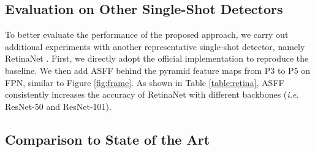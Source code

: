 \documentclass[10pt,twocolumn,letterpaper]{article}
\begin{document}
\subsection{Evaluation on Other Single-Shot Detectors}
To better evaluate the performance of the proposed approach, we carry out additional experiments with another representative single-shot detector, namely RetinaNet \cite{focal-loss}. First, we directly adopt the official implementation \cite{maskrcnnbenchmark} to reproduce the baseline. We then add ASFF behind the pyramid feature maps from P3 to P5 on FPN, similar to Figure \ref{fig:frame}. As shown in Table \ref{table:retina},  
ASFF consistently increases the accuracy of RetinaNet with different backbones (\emph{i.e.} ResNet-50 and ResNet-101).

\begin{table}[htbp]
	\begin{center}
	\end{center}
	\caption{Contribution of ASFF to RetinaNet. APs (\%) are reported on COCO \emph{val}-2017.}
	\label{table:retina}
	\vspace{-.4cm}
\end{table}

\subsection{Comparison to State of the Art}
\end{document}
